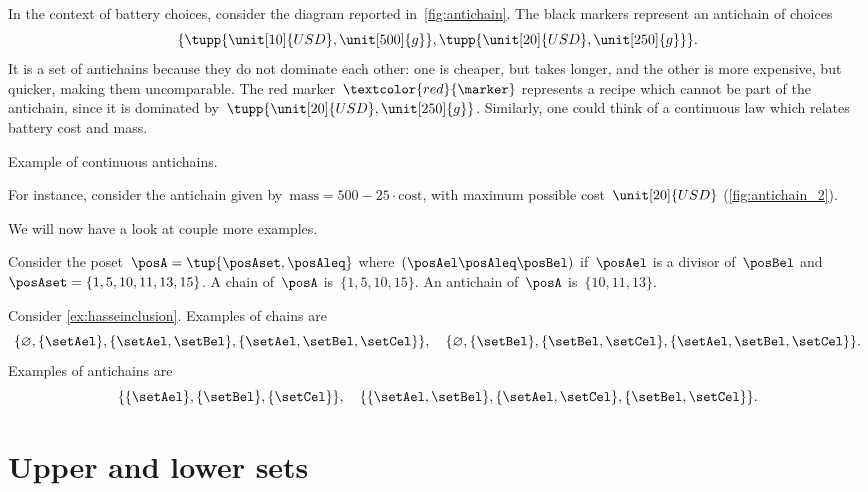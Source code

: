 In the context of battery choices, consider the diagram reported in~\cref{fig:antichain}.
The black markers represent an antichain of choices
\begin{equation}
	\{
	\tupp{\unit[10]{USD},\unit[500]{g}},
	\tupp{\unit[20]{USD},\unit[250]{g}}\}.
\end{equation}
It is a set of antichains because they do not dominate each other: one is cheaper, but takes longer, and the other is more expensive, but quicker, making them uncomparable.
The red marker~$\textcolor{red}{\marker}$ represents a recipe which cannot be part of the antichain, since it is dominated by~$\tupp{\unit[20]{USD},\unit[250]{g}}$.
Similarly, one could think of a continuous law which relates battery cost and mass.
%
\begin{marginfigure}
	\centering
	\caption{Example of continuous antichains.}
	\label{fig:antichain_2}
\end{marginfigure}
%
For instance, consider the antichain given by~$\text{mass}=500-25\cdot \text{cost}$, with maximum possible cost~$\unit[20]{USD}$ (\cref{fig:antichain_2}).

We will now have a look at couple more examples.
\begin{example}
	Consider the poset~$\posA=\tup{\posAset,\posAleq}$ where~$(\posAel \posAleq \posBel)$ if~$\posAel$ is a divisor of~$\posBel$ and~$\posAset=\{1,5,10,11,13,15\}$.
	A chain of~$\posA$ is~$\{1,5,10,15\}$.
	An antichain of~$\posA$ is~$\{10,11,13\}$.
\end{example}

\begin{example}
	Consider \cref{ex:hasseinclusion}.
	Examples of chains are
	\begin{equation}
		\{\varnothing,\{\setAel\},\{\setAel,\setBel\},\{\setAel,\setBel,\setCel\}\}, \quad  \{\varnothing,\{\setBel\},\{\setBel,\setCel\},\{\setAel,\setBel,\setCel\}\}.
	\end{equation}
	Examples of antichains are
	\begin{equation}
		\{\{\setAel\},\{\setBel\},\{\setCel\}\}, \quad \{ \{\setAel,\setBel\},\{\setAel,\setCel\}, \{\setBel,\setCel\}\}.
	\end{equation}
\end{example}

\section{Upper and lower sets}
\label{sec:UpperLowerSets}

